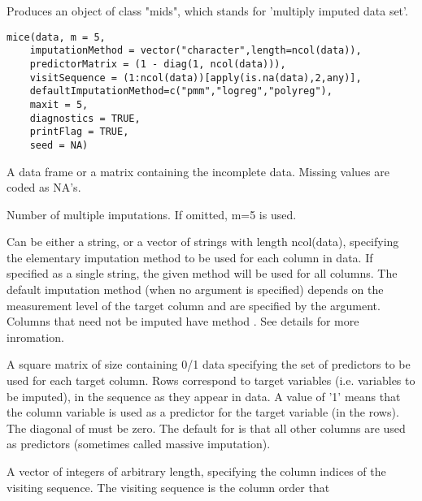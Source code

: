 \begin{Description}\relax
Produces an object of class "mids", which stands
for 'multiply imputed data set'.
\end{Description}
\begin{Usage}
\begin{verbatim}
mice(data, m = 5, 
    imputationMethod = vector("character",length=ncol(data)), 
    predictorMatrix = (1 - diag(1, ncol(data))),
    visitSequence = (1:ncol(data))[apply(is.na(data),2,any)], 
    defaultImputationMethod=c("pmm","logreg","polyreg"),
    maxit = 5, 
    diagnostics = TRUE, 
    printFlag = TRUE,
    seed = NA)
\end{verbatim}
\end{Usage}
\begin{Arguments}
\begin{ldescription}
\item[\code{data}] A data frame or a matrix containing the incomplete
data. Missing values are coded as NA's.
\item[\code{m}] Number of multiple imputations.
If omitted, m=5 is used.
\item[\code{imputationMethod}] Can be either a string,
or a vector of strings with length ncol(data),
specifying the elementary imputation method to be used
for each column in data. If specified as a single
string, the given method will be used for all columns.
The default imputation method (when no argument is specified)
depends on the measurement level of the target column and
are specified by the  argument.
Columns that need not be imputed have method .
See details for more inromation.
\item[\code{predictorMatrix}] A square matrix of size  containing 0/1 data specifying
the set of predictors to be used for each target column. Rows correspond
to target variables (i.e. variables to be imputed), in the sequence as
they appear in data. A value of '1' means that the column variable is
used as a predictor for the target variable (in the rows). The diagonal
of  must be zero. The default for  is that
all other columns are used as predictors (sometimes called massive
imputation).
\item[\code{visitSequence}] A vector of integers of arbitrary length, specifying the column indices
of the visiting sequence. The visiting sequence is the column order that

\end{ldescription}
\end{Arguments}
